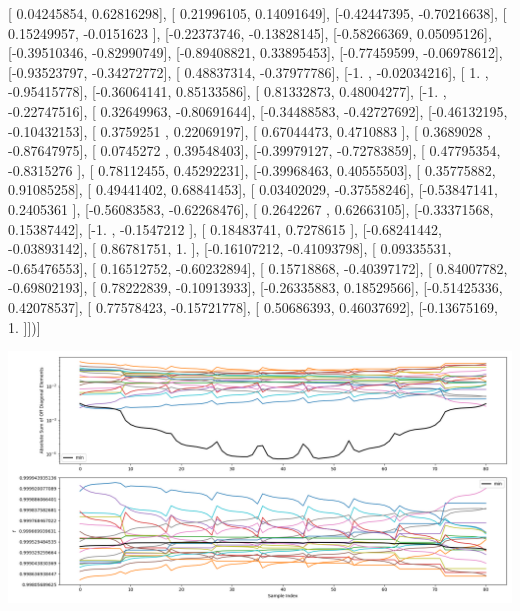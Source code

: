 \documentclass{article}
\begin{document}
       [ 0.04245854,  0.62816298],
       [ 0.21996105,  0.14091649],
       [-0.42447395, -0.70216638],
       [ 0.15249957, -0.0151623 ],
       [-0.22373746, -0.13828145],
       [-0.58266369,  0.05095126],
       [-0.39510346, -0.82990749],
       [-0.89408821,  0.33895453],
       [-0.77459599, -0.06978612],
       [-0.93523797, -0.34272772],
       [ 0.48837314, -0.37977786],
       [-1.        , -0.02034216],
       [ 1.        , -0.95415778],
       [-0.36064141,  0.85133586],
       [ 0.81332873,  0.48004277],
       [-1.        , -0.22747516],
       [ 0.32649963, -0.80691644],
       [-0.34488583, -0.42727692],
       [-0.46132195, -0.10432153],
       [ 0.3759251 ,  0.22069197],
       [ 0.67044473,  0.4710883 ],
       [ 0.3689028 , -0.87647975],
       [ 0.0745272 ,  0.39548403],
       [-0.39979127, -0.72783859],
       [ 0.47795354, -0.8315276 ],
       [ 0.78112455,  0.45292231],
       [-0.39968463,  0.40555503],
       [ 0.35775882,  0.91085258],
       [ 0.49441402,  0.68841453],
       [ 0.03402029, -0.37558246],
       [-0.53847141,  0.2405361 ],
       [-0.56083583, -0.62268476],
       [ 0.2642267 ,  0.62663105],
       [-0.33371568,  0.15387442],
       [-1.        , -0.1547212 ],
       [ 0.18483741,  0.7278615 ],
       [-0.68241442, -0.03893142],
       [ 0.86781751,  1.        ],
       [-0.16107212, -0.41093798],
       [ 0.09335531, -0.65476553],
       [ 0.16512752, -0.60232894],
       [ 0.15718868, -0.40397172],
       [ 0.84007782, -0.69802193],
       [ 0.78222839, -0.10913933],
       [-0.26335883,  0.18529566],
       [-0.51425336,  0.42078537],
       [ 0.77578423, -0.15721778],
       [ 0.50686393,  0.46037692],
       [-0.13675169,  1.        ]])]
\begin{center}
\includegraphics[scale=.9]{report_pickled_controls229/control_dpn_all.png}

\end{center}
\end{document}
